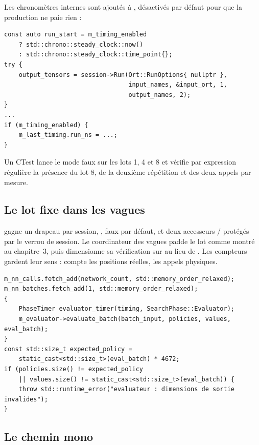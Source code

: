 Les chronom\`etres internes sont ajout\'es \`a , d\'esactiv\'es
par d\'efaut pour que la production ne paie rien :

\begin{lstlisting}[caption={Chronom\'etrage interne optionnel (\code{onnx\_evaluator.cpp}).}]
const auto run_start = m_timing_enabled
    ? std::chrono::steady_clock::now()
    : std::chrono::steady_clock::time_point{};
try {
    output_tensors = session->Run(Ort::RunOptions{ nullptr },
                                  input_names, &input_ort, 1,
                                  output_names, 2);
}
...
if (m_timing_enabled) {
    m_last_timing.run_ns = ...;
}
\end{lstlisting}

Un CTest  lance le mode faux sur les lots
1, 4 et 8 et v\'erifie par expression r\'eguli\`ere la pr\'esence du lot 8, de
la deuxi\`eme r\'ep\'etition et des deux appels par mesure.

\subsection{Le lot fixe dans les vagues}

 gagne un drapeau par session, , faux par
d\'efaut, et deux accesseurs  / 
prot\'eg\'es par le verrou de session. Le coordinateur des vagues padde le lot
comme montr\'e au chapitre~3, puis dimensionne sa v\'erification sur
 au lieu de . Les compteurs gardent leur
sens :  compte les positions r\'eelles,  les
appels physiques.

\begin{lstlisting}[caption={Compteurs et v\'erification de sortie dans les vagues.}]
m_nn_calls.fetch_add(network_count, std::memory_order_relaxed);
m_nn_batches.fetch_add(1, std::memory_order_relaxed);
{
    PhaseTimer evaluator_timer(timing, SearchPhase::Evaluator);
    m_evaluator->evaluate_batch(batch_input, policies, values, eval_batch);
}
const std::size_t expected_policy =
    static_cast<std::size_t>(eval_batch) * 4672;
if (policies.size() != expected_policy
    || values.size() != static_cast<std::size_t>(eval_batch)) {
    throw std::runtime_error("evaluateur : dimensions de sortie invalides");
}
\end{lstlisting}

\subsection{Le chemin mono}

